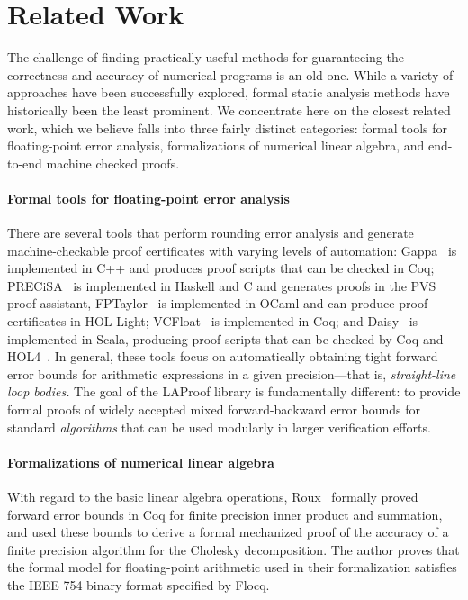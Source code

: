 \section{Related Work}\label{sec:relatedwork} The challenge of finding
practically useful methods for guaranteeing the correctness and accuracy of
numerical programs is an old one. While a variety of approaches have been
successfully explored, formal static analysis methods have historically been the
least prominent. We concentrate here on the closest related work, which we
believe falls into three fairly distinct categories: formal tools for
floating-point error analysis, formalizations of numerical linear algebra, and
end-to-end machine checked proofs.

\paragraph*{Formal tools for floating-point error analysis} There are several
tools that perform rounding error analysis and generate machine-checkable proof
certificates with varying levels of automation: Gappa~\cite{gappa2008} is
implemented in C++ and produces proof scripts that can be checked in Coq;
PRECiSA~\cite{precisa2017} is implemented in Haskell and C and generates proofs
in the PVS~\cite{pvs} proof assistant, FPTaylor~\cite{fptaylor2018} is
implemented in OCaml and can produce proof certificates in HOL Light;
VCFloat~\cite{vcfloat1,vcfloat2} is implemented in Coq; and
Daisy~\cite{daisy2018} is implemented in Scala, producing proof scripts
that can be checked by Coq and HOL4~\cite{flover2018}. In general, these
tools focus on automatically obtaining tight forward error bounds for arithmetic
expressions in a given precision---that is, \emph{straight-line loop bodies.}
The goal of the LAProof library is fundamentally different: to provide formal
proofs of widely accepted mixed forward-backward error bounds for standard
\emph{algorithms} that can be used modularly in larger verification efforts.

\paragraph*{Formalizations of numerical linear algebra} With regard to the basic
linear algebra operations, Roux~\cite{roux_15} formally proved forward
error bounds in Coq for finite precision inner product and summation, and used 
these bounds to derive a formal mechanized proof of the accuracy of a finite precision
algorithm for the Cholesky decomposition. The author proves
that the formal model for floating-point arithmetic used in their
formalization satisfies the IEEE 754 binary format specified by
Flocq.

